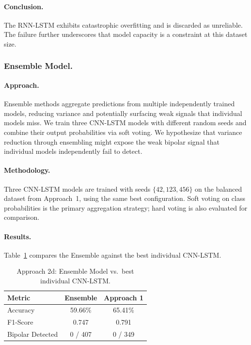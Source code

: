 \paragraph{Conclusion.}
The RNN-LSTM exhibits catastrophic overfitting and is discarded as unreliable. The failure further underscores that model capacity is a constraint at this dataset size.

\subsubsection{Ensemble Model.}

\paragraph{Approach.}
Ensemble methods aggregate predictions from multiple independently trained models, reducing variance and potentially surfacing weak signals that individual models miss. We train three CNN-LSTM models with different random seeds and combine their output probabilities via soft voting. We hypothesize that variance reduction through ensembling might expose the weak bipolar signal that individual models independently fail to detect.

\paragraph{Methodology.}
Three CNN-LSTM models are trained with seeds $\{42, 123, 456\}$ on the balanced dataset from Approach~1, using the same best configuration. Soft voting on class probabilities is the primary aggregation strategy; hard voting is also evaluated for comparison.

\paragraph{Results.}
Table~\ref{tab:approach2d_results} compares the Ensemble against the best individual CNN-LSTM.

\begin{table}[H]
\centering
\caption{Approach 2d: Ensemble Model vs.\ best individual CNN-LSTM.}
\label{tab:approach2d_results}
\begin{tabular}{lcc}
\toprule
\textbf{Metric} & \textbf{Ensemble} & \textbf{Approach 1} \\
\midrule
Accuracy & 59.66\% & 65.41\% \\
F1-Score & 0.747 & 0.791 \\
Bipolar Detected & 0 / 407 & 0 / 349 \\
\bottomrule
\end{tabular}
\end{table}

